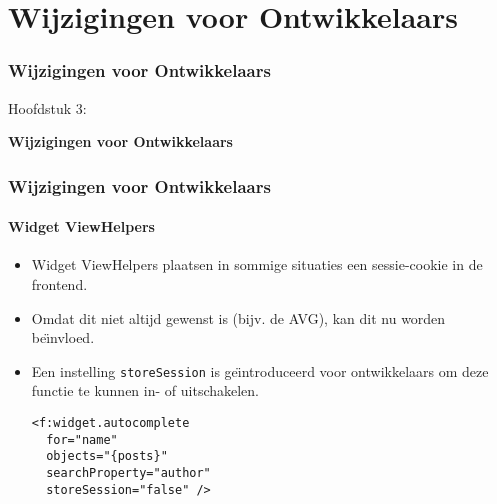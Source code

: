%

\section{Wijzigingen voor Ontwikkelaars}
\begin{frame}[fragile]
	\frametitle{Wijzigingen voor Ontwikkelaars}

	\begin{center}\huge{Hoofdstuk 3:}\end{center}
	\begin{center}\huge{\color{typo3darkgrey}\textbf{Wijzigingen voor Ontwikkelaars}}\end{center}

\end{frame}


\begin{frame}[fragile]
	\frametitle{Wijzigingen voor Ontwikkelaars}
	\framesubtitle{Widget ViewHelpers}

	\lstset{basicstyle=\smaller\ttfamily}

	\begin{itemize}
		\item Widget ViewHelpers plaatsen in sommige situaties een sessie-cookie in de frontend.
		\item Omdat dit niet altijd gewenst is (bijv. de AVG), kan dit nu worden be\"{\i}nvloed.
		\item Een instelling \texttt{storeSession} is ge\"{\i}ntroduceerd voor ontwikkelaars om deze functie te kunnen in- of uitschakelen.
\begin{lstlisting}
<f:widget.autocomplete
  for="name"
  objects="{posts}"
  searchProperty="author"
  storeSession="false" />
\end{lstlisting}

	\end{itemize}

\end{frame}

